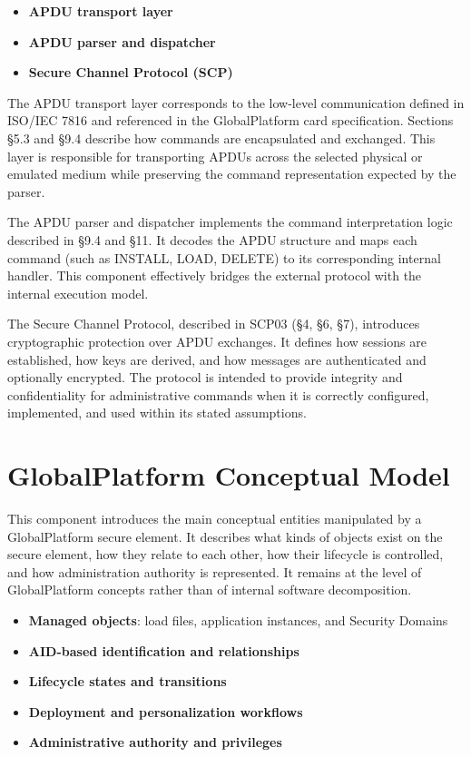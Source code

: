\begin{itemize}
\item \textbf{APDU transport layer} 
\item \textbf{APDU parser and dispatcher} 
\item \textbf{Secure Channel Protocol (SCP)} 
\end{itemize}

The APDU transport layer corresponds to the low-level communication defined in
ISO/IEC 7816 and referenced in the GlobalPlatform card specification. Sections
§5.3 and §9.4 describe how commands are encapsulated and exchanged. This layer
is responsible for transporting APDUs across the selected physical or emulated
medium while preserving the command representation expected by the parser.

The APDU parser and dispatcher implements the command interpretation logic
described in §9.4 and §11. It decodes the APDU structure and maps each command
(such as INSTALL, LOAD, DELETE) to its corresponding internal handler. This
component effectively bridges the external protocol with the internal execution
model.

The Secure Channel Protocol, described in SCP03 (§4, §6, §7), introduces
cryptographic protection over APDU exchanges. It defines how sessions are
established, how keys are derived, and how messages are authenticated and
optionally encrypted. The protocol is intended to provide integrity and
confidentiality for administrative commands when it is correctly configured,
implemented, and used within its stated assumptions.

\section{GlobalPlatform Conceptual Model}

This component introduces the main conceptual entities manipulated by a
GlobalPlatform secure element. It describes what kinds of objects exist on the
secure element, how they relate to each other, how their lifecycle is controlled,
and how administration authority is represented. It remains at the level
of GlobalPlatform concepts rather than of internal software
decomposition.

\begin{itemize}
\item \textbf{Managed objects}: load files, application instances, and Security
  Domains 
\item \textbf{AID-based identification and relationships}
\item \textbf{Lifecycle states and transitions}
\item \textbf{Deployment and personalization workflows}
\item \textbf{Administrative authority and privileges}
\end{itemize}

